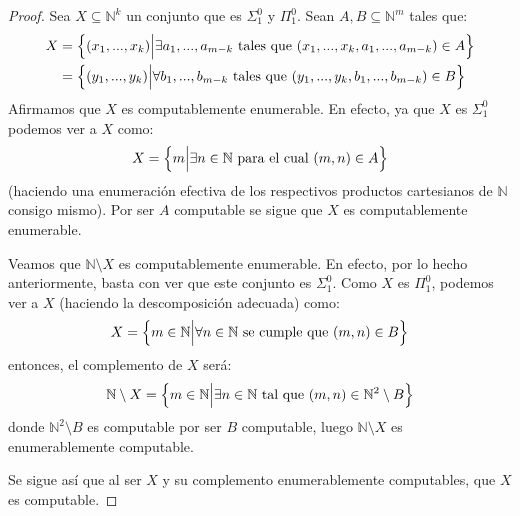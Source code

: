 \documentclass[12pt]{report}
\newcounter{it}
\theoremstyle{largebreak}
\begin{document}
    \begin{proof}
        Sea $X\subseteq\mathbb{N}^k$ un conjunto que es $\Sigma_1^0$ y $\Pi_1^0$. Sean $A,B\subseteq\mathbb{N}^m$ tales que:
        \begin{equation*}
            \begin{split}
                X&=\left\{(x_1,...,x_k)\Big|\exists a_1,...,a_{ m-k}\textup{ tales que }(x_1,...,x_k,a_1,...,a_{m-k})\in A\right\}\\
                &=\left\{(y_1,...,y_k)\Big|\forall b_1,...,b_{ m-k}\textup{ tales que }(y_1,...,y_k,b_1,...,b_{m-k})\in B\right\}\\
            \end{split}
        \end{equation*}
        Afirmamos que $X$ es computablemente enumerable. En efecto, ya que $X$ es $\Sigma_1^0$ podemos ver a $X$ como:
        \begin{equation*}
            X=\left\{m\Big|\exists n\in\mathbb{N}\textup{ para el cual }(m,n)\in A \right\}
        \end{equation*}
        (haciendo una enumeración efectiva de los respectivos productos cartesianos de $\mathbb{N}$ consigo mismo). Por ser $A$ computable se sigue que $X$ es computablemente enumerable.
        
        Veamos que $\mathbb{N}\setminus X$ es computablemente enumerable. En efecto, por lo hecho anteriormente, basta con ver que este conjunto es $\Sigma_1^0$. Como $X$ es $\Pi_1^0$, podemos ver a $X$ (haciendo la descomposición adecuada) como:
        \begin{equation*}
            X=\left\{m\in\mathbb{N}\Big|\forall n\in\mathbb{N}\textup{ se cumple que }(m,n)\in B \right\}
        \end{equation*}
        entonces, el complemento de $X$ será:
        \begin{equation*}
            \mathbb{N}\setminus X=\left\{m\in\mathbb{N}\Big|\exists n\in\mathbb{N}\textup{ tal que }(m,n)\in \mathbb{N}^2\setminus B \right\}
        \end{equation*}
        donde $\mathbb{N}^2\setminus B$ es computable por ser $B$ computable, luego $\mathbb{N}\setminus X$ es enumerablemente computable.
        
        Se sigue así que al ser $X$ y su complemento enumerablemente computables, que $X$ es computable.
    \end{proof}
\end{document}
